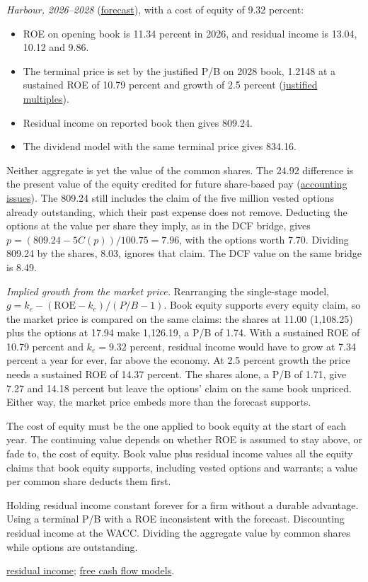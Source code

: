 \begin{qfmethod}
\emph{Harbour, 2026--2028} (\hyperref[ex:harbour-pro-forma-model]{forecast}), with a cost of equity of 9.32 percent:
\begin{itemize}
\item ROE on opening book is 11.34 percent in 2026, and residual income is 13.04, 10.12 and 9.86.
\item The terminal price is set by the justified P/B on 2028 book, 1.2148 at a sustained ROE of 10.79 percent and growth of 2.5 percent (\hyperref[meth:justified-multiples]{justified multiples}).
\item Residual income on reported book then gives 809.24.
\item The dividend model with the same terminal price gives 834.16.
\end{itemize}
Neither aggregate is yet the value of the common shares. The 24.92 difference is the present value of the equity credited for future share-based pay (\hyperref[meth:residual-income-comparison]{accounting issues}). The 809.24 still includes the claim of the five million vested options already outstanding, which their past expense does not remove. Deducting the options at the value per share they imply, as in the DCF bridge, gives $p=(809.24-5C(p))/100.75=7.96$, with the options worth 7.70. Dividing 809.24 by the shares, 8.03, ignores that claim. The DCF value on the same bridge is 8.49.

\emph{Implied growth from the market price.} Rearranging the single-stage model, $g=k_e-(\mathrm{ROE}-k_e)/(P/B-1)$. Book equity supports every equity claim, so the market price is compared on the same claims: the shares at 11.00 (1,108.25) plus the options at 17.94 make 1,126.19, a P/B of 1.74. With a sustained ROE of 10.79 percent and $k_e=9.32$ percent, residual income would have to grow at 7.34 percent a year for ever, far above the economy. At 2.5 percent growth the price needs a sustained ROE of 14.37 percent. The shares alone, a P/B of 1.71, give 7.27 and 14.18 percent but leave the options' claim on the same book unpriced. Either way, the market price embeds more than the forecast supports.

 The cost of equity must be the one applied to book equity at the start of each year. The continuing value depends on whether ROE is assumed to stay above, or fade to, the cost of equity. Book value plus residual income values all the equity claims that book equity supports, including vested options and warrants; a value per common share deducts them first.

 Holding residual income constant forever for a firm without a durable advantage. Using a terminal P/B with a ROE inconsistent with the forecast. Discounting residual income at the WACC. Dividing the aggregate value by common shares while options are outstanding.

 \hyperref[def:residual-income-eva]{residual income}; \hyperref[meth:fcf-valuation-models]{free cash flow models}.

\end{qfmethod}


